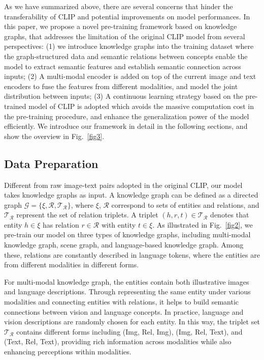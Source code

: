 As we have summarized above, there are several concerns that hinder the transferability of CLIP and potential improvements on model performances. In this paper, we propose a novel pre-training framework based on knowledge graphs, that addresses the limitation of the original CLIP model from several perspectives: (1) we introduce knowledge graphs into the training dataset where the graph-structured data and semantic relations between concepts enable the model to extract semantic features and establish semantic connection across inputs; (2) A multi-modal encoder is added on top of the current image and text encoders to fuse the features from different modalities, and model the joint distribution between inputs; (3) A continuous learning strategy based on the pre-trained model of CLIP is adopted which avoids the massive computation cost in the pre-training procedure, and enhance the generalization power of the model efficiently. We introduce our framework in detail in the following sections, and show the overview in Fig.~\ref{fig3}.

\subsection{Data Preparation}
Different from raw image-text pairs adopted in the original CLIP, our model takes knowledge graphs as input. A knowledge graph can be defined as a directed graph $\mathcal{G}=\{\xi, \mathcal{R}, \mathcal{T}_\mathcal{R}\}$, where $\xi$, $\mathcal{R}$ correspond to sets of entities and relations, and $\mathcal{T}_\mathcal{R}$ represent the set of relation triplets. A triplet $(h,r,t)\in \mathcal{T}_\mathcal{R}$ denotes that entity $h\in \xi$ has relation $r\in \mathcal{R}$ with entity $t \in \xi$. As illustrated in Fig.~\ref{fig2}, we pre-train our model on three types of knowledge graphs, including multi-modal knowledge graph, scene graph, and language-based knowledge graph. Among these, relations are constantly described in language tokens, where the entities are from different modalities in different forms.

For multi-modal knowledge graph, the entities contain both illustrative images and language descriptions. Through representing the same entity under various modalities and connecting entities with relations, it helps to build semantic connections between vision and language concepts. In practice, language and vision descriptions are randomly chosen for each entity. In this way, the triplet set $\mathcal{T}_\mathcal{R}$ contains different forms including (Img, Rel, Img), (Img, Rel, Text), and (Text, Rel, Text), providing rich information across modalities while also enhancing perceptions within modalities. 

